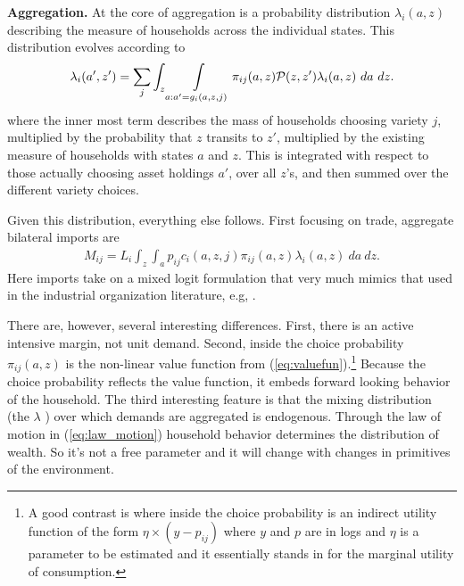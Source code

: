 \documentclass[12pt,pdftex]{article}
\begin{document}
\begin{onehalfspacing}
\textbf{Aggregation.} At the core of aggregation is a probability distribution $\lambda_{i}(a, z)$ describing the measure of households across the individual states. This distribution evolves according to
\begin{align}
\lambda_i(a', z') = \sum_{j} \int_{z}\int\displaylimits_{a: a' = g_{i}(a, z, j)} \pi_{ij}(a, z) \mathcal{P}(z, z') \lambda_i(a, z) \ da \ dz.
\label{eq:law_motion}
\end{align}
where the inner most term describes the mass of households choosing variety $j$, multiplied by the probability that $z$ transits to $z'$, multiplied by the existing measure of households with states $a$ and $z$. This is integrated with respect to those actually choosing asset holdings $a'$, over all $z$'s, and then summed over the different variety choices.

Given this distribution, everything else follows. First focusing on trade, aggregate bilateral imports are
\begin{align}
M_{ij} = L_i \int_{z} \int_{a}  p_{ij} c_{i}(a, z, j) \pi_{ij}(a, z) \lambda_i(a, z) \ da \ dz.
\label{eq:imports}
\end{align}
Here imports take on a mixed logit formulation that very much mimics that used in the industrial organization literature, e.g, \citet*{berry1995automobile}.

There are, however, several interesting differences. First, there is an active intensive margin, not unit demand. Second, inside the choice probability $\pi_{ij}(a, z)$ is the non-linear value function from (\ref{eq:valuefun}).\footnote{A good contrast is \citet{nevo2000practitioner} where inside the choice probability is an indirect utility function of the form $\eta \times (y - p_{ij})$ where $y$ and $p$ are in logs and $\eta$ is a parameter to be estimated and it essentially stands in for the marginal utility of consumption.} Because the choice probability reflects the value function, it embeds forward looking behavior of the household. The third interesting feature is that the mixing distribution (the $\lambda$ ) over which demands are aggregated is endogenous. Through the law of motion in (\ref{eq:law_motion}) household behavior determines the distribution of wealth. So it's not a free parameter and it will change with changes in primitives of the environment.


\end{onehalfspacing}
\end{document}
